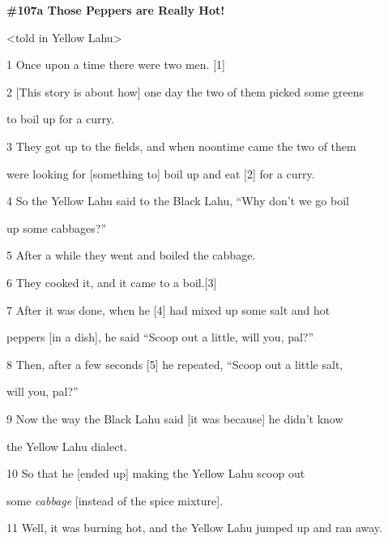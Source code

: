
{\LARGE{}\textbf{\#107a Those Peppers are Really Hot!}}

{\LARGE{}<told in Yellow Lahu>}

{\LARGE{}1 Once upon a time there were two men. [1]}

{\LARGE{}2 [This story is about how] one day the two of them picked some greens
}

{\LARGE{}to boil up for a curry.}

{\LARGE{}3 They got up to the fields, and when noontime came the two of them
}

{\LARGE{}were looking for [something to] boil up and eat [2] for a curry.}

{\LARGE{}4 So the Yellow Lahu said to the Black Lahu, ``Why don't we go boil
}

{\LARGE{}up some cabbages?''}

{\LARGE{}5 After a while they went and boiled the cabbage.}

{\LARGE{}6 They cooked it, and it came to a boil.[3]}

{\LARGE{}7 After it was done, when he [4] had mixed up some salt and hot    }

{\LARGE{}peppers [in a dish], he said ``Scoop out a little, will you, pal?''}

{\LARGE{}8 Then, after a few seconds [5] he repeated, ``Scoop out a little salt,
}

{\LARGE{}will you, pal?''}

{\LARGE{}9 Now the way the Black Lahu said [it was because] he didn't know    }

{\LARGE{}the Yellow Lahu dialect.}

{\LARGE{}10 So that he [ended up] making the Yellow Lahu scoop out     }

{\LARGE{}some }{\LARGE{}\textit{cabbage }}{\LARGE{}[instead of the spice mixture].}

{\LARGE{}11 Well, it was burning hot, and the Yellow Lahu jumped up and ran away.}

